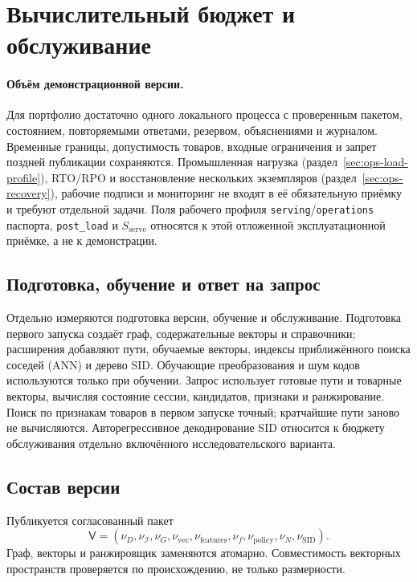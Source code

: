 \documentclass[12pt,a4paper]{article}
\newcommand{\code}[1]{{\ttfamily\small\nolinkurl{#1}}}
\theoremstyle{plainru}
\begin{document}
\section{Вычислительный бюджет и обслуживание}\label{sec:operations-serving}

\paragraph{Объём демонстрационной версии.}
Для портфолио достаточно одного локального процесса с проверенным пакетом,
состоянием, повторяемыми ответами, резервом, объяснениями и журналом.
Временные границы, допустимость товаров, входные ограничения и запрет
поздней публикации сохраняются. Промышленная нагрузка
(раздел~\ref{sec:ops-load-profile}), RTO/RPO и восстановление нескольких
экземпляров (раздел~\ref{sec:ops-recovery}), рабочие подписи и мониторинг
не входят в её обязательную приёмку и требуют отдельной задачи.
Поля рабочего профиля \code{serving}/\code{operations} паспорта,
\code{post_load} и $S_{\mathrm{serve}}$ относятся к этой отложенной
эксплуатационной приёмке, а не к демонстрации.

\subsection{Подготовка, обучение и ответ на запрос}
\label{sec:ops-compute-stages}

Отдельно измеряются подготовка версии, обучение и обслуживание.
Подготовка первого запуска создаёт граф, содержательные векторы
и справочники; расширения добавляют пути, обучаемые векторы,
индексы приближённого поиска соседей (ANN) и дерево SID.
Обучающие преобразования и шум кодов используются только при обучении.
Запрос использует готовые пути и товарные векторы, вычисляя состояние
сессии, кандидатов, признаки и ранжирование. Поиск по признакам товаров
в первом запуске точный; кратчайшие пути заново не вычисляются.
Авторегрессивное декодирование SID относится к бюджету обслуживания
отдельно включённого исследовательского варианта.

\subsection{Состав версии}

Публикуется согласованный пакет
\begin{equation}\label{eq:ops-package}
\mathsf V=(\nu_D,\nu_{\mathcal I},\nu_G,\nu_{\mathrm{vec}},
\nu_{\mathrm{features}},\nu_f,\nu_{\mathrm{policy}},
\nu_N,\nu_{\mathrm{SID}}).
\end{equation}
Граф, векторы и ранжировщик заменяются атомарно.
Совместимость векторных пространств проверяется по происхождению,
не только размерности.
\end{document}
